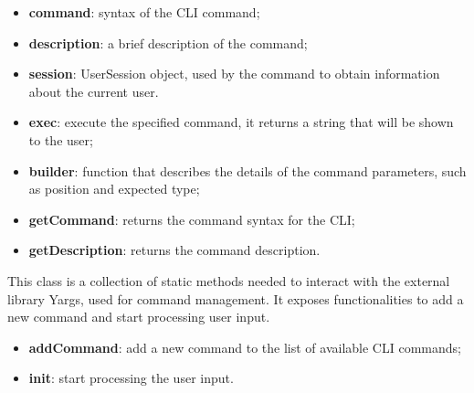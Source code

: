 					\begin{itemize}
						\item \textbf{command}: syntax of the CLI command;
						\item \textbf{description}: a brief description of the command;
						\item \textbf{session}: UserSession object, used by the command to obtain information about the current user.
					\end{itemize}
				
					\begin{itemize}
						\item \textbf{exec}: execute the specified command, it returns a string that will be shown to the user;
						\item \textbf{builder}: function that describes the details of the command parameters, such as position and expected type;
						\item \textbf{getCommand}: returns the command syntax for the CLI;
						\item \textbf{getDescription}: returns the command description.
					\end{itemize}
	
			This class is a collection of static methods needed to interact with the external library Yargs, used for command management. It exposes functionalities to add a new command and start processing user input. 
					\begin{itemize}
						\item \textbf{addCommand}: add a new command to the list of available CLI commands;
						\item \textbf{init}: start processing the user input.
					\end{itemize}
			
